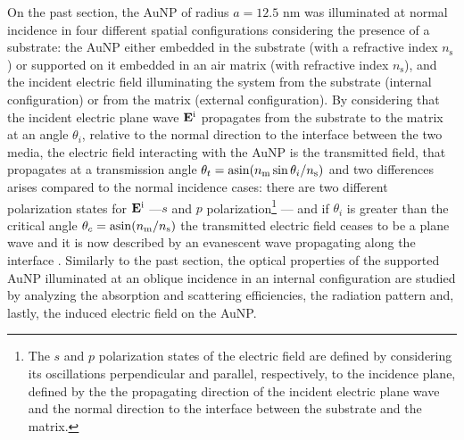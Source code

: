 
On the past section, the AuNP of radius $a = 12.5$ nm was illuminated at normal incidence in four different spatial configurations considering the  presence of a substrate: the AuNP either embedded in the substrate (with a refractive index $n_\text{s}$) or supported on it embedded in an air matrix (with refractive index $n_\text{s}$), and the incident electric field  illuminating the system from the substrate (internal configuration) or from the matrix (external configuration). By considering that the incident electric plane wave $\vb{E}^\text{i}$  propagates from the substrate to the matrix at an angle $\theta_i$, relative to the normal direction to the interface between the two media, the electric field interacting with the AuNP is the transmitted field, that propagates at a transmission angle $\theta_t = \asin(n_\text{m}\sin\theta_i/n_\text{s})$ \cite{born_max_principle_1999} and two differences arises compared to the normal incidence cases: there are two different polarization states for $\vb{E}^\text{i}$ ---$s$ and $p$ polarization\footnote{%
    The $s$ and $p$ polarization states of the electric field are defined by considering its oscillations perpendicular and parallel, respectively, to the incidence plane, defined by the the propagating direction of the incident electric plane wave and the normal direction to the interface between the substrate and the matrix.}%
--- and if $\theta_i$ is greater than the critical angle $\theta_c = \asin(n_\text{m}/n_\text{s})$ the transmitted electric field ceases to be a plane wave and it is now described by an evanescent wave propagating along the interface  \cite{born_max_principle_1999}. Similarly to the past section, the optical properties of the supported AuNP illuminated at an oblique incidence in an internal configuration are studied by analyzing the absorption and scattering efficiencies, the radiation pattern and, lastly, the induced electric field on the AuNP.

